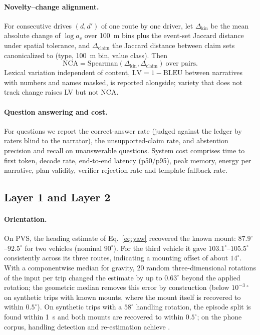 \paragraph{Novelty--change alignment.}
For consecutive drives $(d,d')$ of one route by one driver, let $\Delta_{\mathrm{kin}}$ be the mean absolute change of $\log a_v$ over 100~m bins plus the event-set Jaccard distance under spatial tolerance, and $\Delta_{\mathrm{claim}}$ the Jaccard distance between claim sets canonicalized to (type, 100~m bin, value class).
Then
\begin{equation}
\mathrm{NCA}=\mathrm{Spearman}(\Delta_{\mathrm{kin}},\Delta_{\mathrm{claim}})\ \text{over pairs}.
\end{equation}
Lexical variation independent of content, $\mathrm{LV}=1-\mathrm{BLEU}$ between narratives with numbers and names masked, is reported alongside; variety that does not track change raises LV but not NCA.

\paragraph{Question answering and cost.}
For questions we report the correct-answer rate (judged against the ledger by raters blind to the narrator), the unsupported-claim rate, and abstention precision and recall on unanswerable questions.
System cost comprises time to first token, decode rate, end-to-end latency (p50/p95), peak memory, energy per narrative, plan validity, verifier rejection rate and template fallback rate.

\subsection{Layer 1 and Layer 2}
\label{sec:l1eval}

\paragraph{Orientation.}
On PVS, the heading estimate of Eq.~\eqref{eq:yaw} recovered the known mount: $87.9^\circ$--$92.5^\circ$ for two vehicles (nominal $90^\circ$).
For the third vehicle it gave $103.1^\circ$--$105.5^\circ$ consistently across its three routes, indicating a mounting offset of about $14^\circ$.
With a componentwise median for gravity, 20 random three-dimensional rotations of the input per trip changed the estimate by up to $0.63^\circ$ beyond the applied rotation; the geometric median removes this error by construction (below $10^{-3}$\,$^\circ$ on synthetic trips with known mounts, where the mount itself is recovered to within $0.5^\circ$).
On synthetic trips with a $58^\circ$ handling rotation, the episode split is found within 1~s and both mounts are recovered to within $0.5^\circ$; on the phone corpus, handling detection and re-estimation achieve \TBD{}.

